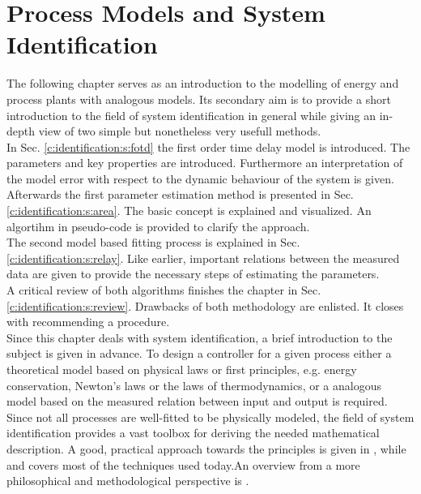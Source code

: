 \chapter{Process Models and System Identification}\label{c:identification}

The following chapter serves as an introduction to the modelling of energy and process plants with analogous models. Its secondary aim is to provide a short introduction to the field of system identification in general while giving an in-depth view of two simple but nonetheless very usefull methods.\\

In Sec. \ref{c:identification:s:fotd} the first order time delay model is introduced. The parameters and key properties are introduced. Furthermore an interpretation of the model error with respect to the dynamic behaviour of the system is given. \\

Afterwards the first parameter estimation method is presented in Sec. \ref{c:identification:s:area}. The basic concept is explained and visualized. An algortihm in pseudo-code is provided to clarify the approach. \\

The second model based fitting process is explained in Sec. \ref{c:identification:s:relay}. Like earlier, important relations between the measured data are given to provide the necessary steps of estimating the parameters. \\

A critical review of both algorithms finishes the chapter in Sec.\ref{c:identification:s:review}. Drawbacks of both methodology are enlisted. It closes with recommending a procedure.\\

Since this chapter deals with system identification, a brief introduction to the subject is given in advance. To design a controller for a given process either a theoretical model based on physical laws or first principles, e.g. energy conservation, Newton's laws or the laws of thermodynamics, or a analogous model based on the measured relation between input and output is required. Since not all processes are well-fitted to be physically modeled, the field of system identification provides a vast toolbox for deriving the needed mathematical description. A good, practical approach towards the principles is given in \cite{Keesman2011}, while \cite{Isermann1992} and \cite{Isermann1992a} covers most of the techniques used today.An overview from a more philosophical and methodological perspective is \cite{Ljung2010}.\\

